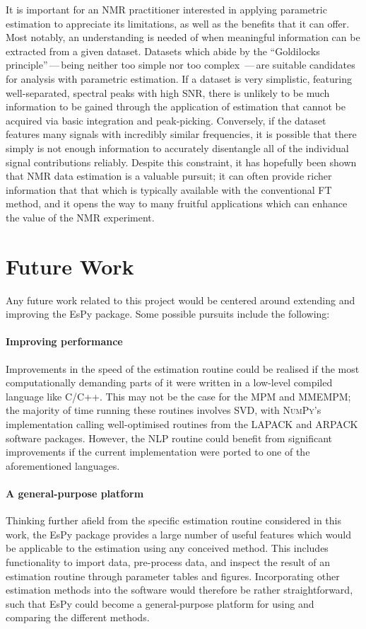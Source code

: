 It is important for an \ac{NMR} practitioner interested in applying
parametric estimation to appreciate its limitations, as well as the
benefits that it can offer. Most notably, an understanding is needed of when
meaningful information can be extracted from a given dataset.
Datasets which abide by the ``Goldilocks principle''\,---\,being neither too
simple nor too complex \,---\,are suitable candidates for analysis with
parametric estimation.
If a dataset is very simplistic, featuring well-separated,
spectral peaks with high \ac{SNR}, there is unlikely to be much information
to be gained through the application of estimation that cannot be acquired via
basic integration and peak-picking.
Conversely, if the dataset features many signals with incredibly similar
frequencies, it is possible that there simply is not enough
information to accurately disentangle all of the individual signal
contributions reliably.
Despite this constraint, it has hopefully been shown that \ac{NMR} data
estimation is a valuable pursuit; it can often provide richer information that
that which is typically available with the conventional \ac{FT} method, and it
opens the way to many fruitful applications which can enhance the value of the
\ac{NMR} experiment.

\section{Future Work}
\label{sec:future-work}
Any future work related to this project would be centered around extending and
improving the \ac{EsPy} package. Some possible pursuits include the following:

\paragraph{Improving performance}
Improvements in the speed of the estimation routine
could be realised if the most computationally demanding parts of it were
written in a low-level compiled language like C/C++. This may not
be the case for the \ac{MPM} and \ac{MMEMPM}; the majority of time running
these routines involves \ac{SVD}, with \textsc{NumPy}'s implementation calling
well-optimised routines from the \textsc{LAPACK} and \textsc{ARPACK} software
packages. However, the \ac{NLP} routine could
benefit from significant improvements if the current \Python implementation
were ported to one of the aforementioned languages.

\paragraph{A general-purpose platform}
Thinking further afield from the specific estimation routine considered in this
work, the \ac{EsPy} package provides a large number of useful features which
would be applicable to the estimation using any conceived method. This includes
functionality to import data, pre-process data, and inspect the result of an
estimation routine through parameter tables and figures.
Incorporating other estimation methods into the software would therefore be
rather straightforward, such that \ac{EsPy} could become a general-purpose
platform for using and comparing the different methods.

